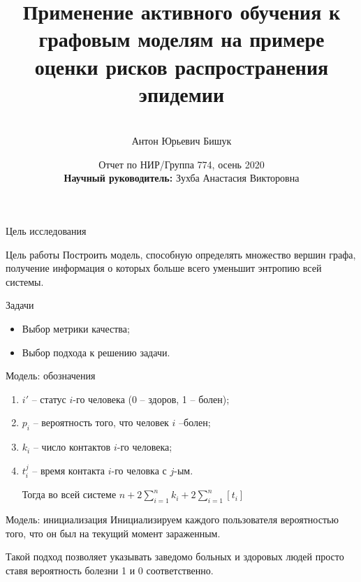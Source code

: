 \documentclass[hyperref={unicode}]{beamer}
\title[\hbox to 56mm{Joint Convex Learning \hfill\insertframenumber\,/\,\inserttotalframenumber}]
{Применение активного обучения к графовым моделям на примере оценки рисков распространения эпидемии}
\author[А.\,Ю. Бишук]{\large \\Антон Юрьевич Бишук}
\institute{\large
Московский физико-технический институт}
\date{\footnotesize{Отчет по НИР/Группа 774, осень 2020\\\textbf{Научный руководитель:} Зухба Анастасия Викторовна}}
\begin{document}
\begin{frame}
\titlepage
\end{frame}
\begin{frame}{Цель исследования}
\begin{block}{Цель работы}
\footnotesize 
Построить модель, способную определять множество вершин графа, получение информация о которых больше всего уменьшит энтропию всей системы.
\end{block}

\begin{block}{Задачи}
\footnotesize 
\begin{itemize}
    \item Выбор метрики качества;
    \item Выбор подхода к решению задачи.
\end{itemize}
\end{block}

\end{frame}
\begin{frame}{Модель: обозначения}
\begin{enumerate}
    \item $i'$ -- статус $i$-го человека (0 -- здоров, 1 -- болен);
    \item $p_i$ -- вероятность того, что человек $i$ --болен;
    \item $k_i$ -- число контактов $i$-го человека;
    \item $t_i^j$ -- время контакта $i$-го человка с $j$-ым.
    
    Тогда во всей системе $n + 2\sum\limits_{i=1}^nk_i + 2\sum\limits_{i=1}^n[t_i]$
\end{enumerate} 
\end{frame}
\begin{frame}{Модель: инициализация}
Инициализируем каждого пользователя вероятностью того, что он был на текущий момент зараженным.

Такой подход позволяет указывать заведомо больных и здоровых людей просто ставя вероятность болезни 1 и 0 соответственно.
\end{frame}
\end{document}
